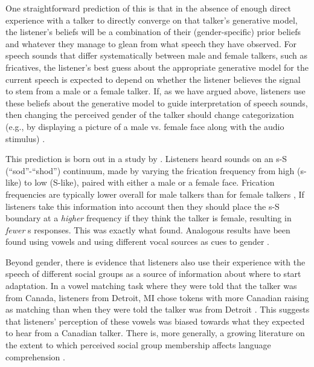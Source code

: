 One straightforward prediction of this is that in the absence of enough direct experience with a talker to directly converge on that talker's generative model, the listener's beliefs will be a combination of their (gender-specific) prior beliefs and whatever they manage to glean from what speech they have observed.  For speech sounds that differ systematically between male and female talkers, such as fricatives, the listener's best guess about the appropriate generative model for the current speech is expected to depend on whether the listener believes the signal to stem from a male or a female talker.  If, as we have argued above, listeners use these beliefs about the generative model to guide interpretation of speech sounds, then changing the perceived gender of the talker should change categorization (e.g., by displaying a picture of a male vs. female face along with the audio stimulus) .

This prediction is born out in a study by \textcite{Strand1996} \autocite[see also][]{Strand1999,Munson2011a}.  Listeners heard sounds on an \ph s-\ph S (``sod''-``shod'') continuum, made by varying the frication frequency from high (\ph s-like) to low (\ph S-like), paired with either a male or a female face.  Frication frequencies are typically lower overall for male talkers than for female talkers \autocite{Jongman2000,McMurray2011a,Newman2001},  If listeners take this information into account then they should place the \ph s-\ph S boundary at a \emph{higher} frequency if they think the talker is female, resulting in \emph{fewer} \ph s responses.  This was exactly what \textcite{Strand1996} found.  Analogous results have been found using vowels \autocite{Johnson1999} and using different vocal sources as cues to gender \autocite[rather than faces][]{Strand1996,Strand1999,Johnson1999,Munson2011a}.  

Beyond gender, there is evidence that listeners also use their experience with the speech of different social groups as a source of information about where to start adaptation.  In a vowel matching task where they were told that the talker was from Canada, listeners from Detroit, MI chose tokens with more Canadian raising as matching than when they were told the talker was from Detroit \autocite{Niedzielski1999}.  This suggests that listeners' perception of these vowels was biased towards what they expected to hear from a Canadian talker.  There is, more generally, a growing literature on the extent to which perceived social group membership affects language comprehension \autocite{Drager2010,Hay2006,Hay2010,StaumCasasanto2008,Sidaras2014}.

